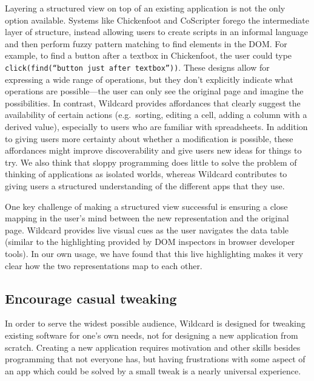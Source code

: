 \documentclass[english,submission]{programming}
\begin{document}
Layering a structured view on top of an existing application is not the
only option available. Systems like Chickenfoot \autocite{bolin2005} and
CoScripter \autocite{leshed2008} forego the intermediate layer of
structure, instead allowing users to create scripts in an informal
language and then perform fuzzy pattern matching to find elements in the
DOM. For example, to find a button after a textbox in Chickenfoot, the
user could type \texttt{click(find(“button\ just\ after\ textbox”))}.
These designs allow for expressing a wide range of operations, but they
don't explicitly indicate what operations are possible---the user can
only see the original page and imagine the possibilities. In contrast,
Wildcard provides affordances that clearly suggest the availability of
certain actions (e.g.~sorting, editing a cell, adding a column with a
derived value), especially to users who are familiar with spreadsheets.
In addition to giving users more certainty about whether a modification
is possible, these affordances might improve discoverability and give
users new ideas for things to try. We also think that sloppy programming
does little to solve the problem of thinking of applications as isolated
worlds, whereas Wildcard contributes to giving users a structured
understanding of the different apps that they use.

One key challenge of making a structured view successful is ensuring a
close mapping in the user's mind between the new representation and the
original page. Wildcard provides live visual cues as the user navigates
the data table (similar to the highlighting provided by DOM inspectors
in browser developer tools). In our own usage, we have found that this
live highlighting makes it very clear how the two representations map to
each other.

\hypertarget{encourage-casual-tweaking}{%
\subsection{Encourage casual tweaking}\label{encourage-casual-tweaking}}

In order to serve the widest possible audience, Wildcard is designed for
tweaking existing software for one's own needs, not for designing a new
application from scratch. Creating a new application requires motivation
and other skills besides programming that not everyone has, but having
frustrations with some aspect of an app which could be solved by a small
tweak is a nearly universal experience.
\end{document}
